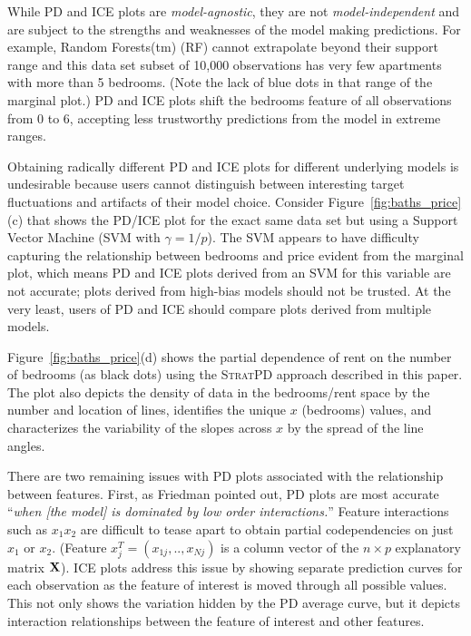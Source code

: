 \documentclass[12pt]{article}
\newcommand{\figref}[1]{Figure~\ref{#1}}
\newcommand{\cut}[1]{}
\newcommand{\spd}{\fontfamily{cmr}\textsc{\small StratPD}}
\begin{document}
\cut{The partial dependence plot broadly follows the marginal plot except for the prices of two and three bedrooms apartments, where it levels off. This is counterintuitive and exposes an issue with PD and ICE plots.} While PD and ICE plots are {\em model-agnostic}, they are not {\em model-independent} and are subject to the strengths and weaknesses of the model making predictions.  For example, Random Forests(tm) (RF) cannot extrapolate beyond their support range and this data set subset of 10,000 observations has very few apartments with more than 5 bedrooms.  (Note the lack of blue dots in that range of the marginal plot.) PD and ICE plots shift the bedrooms feature of all observations from 0 to 6, accepting less trustworthy predictions from the model in extreme ranges.   

Obtaining radically different PD and ICE plots for different underlying models is undesirable because users cannot distinguish between interesting target fluctuations and artifacts of their model choice. Consider \figref{fig:baths_price}(c) that shows the PD/ICE plot for the exact same data set but using a Support Vector Machine (SVM with $\gamma=1/p$). The SVM appears to have difficulty capturing the relationship between bedrooms and price evident from the marginal plot, which means PD and ICE plots derived from an SVM for this variable are not accurate; plots derived from high-bias models should not be trusted. At the very least, users of PD and ICE should compare plots derived from multiple models. 

\figref{fig:baths_price}(d) shows the partial dependence of rent on the number of bedrooms (as black dots) using the \spd{} approach described in this paper. The plot also depicts the density of data in the bedrooms/rent space by the number and location of lines, identifies the unique $x$ (bedrooms) values, and characterizes the variability of the slopes across $x$ by the spread of the line angles.

There are two remaining issues with PD plots associated with the relationship between features. First, as Friedman pointed out, PD plots are most accurate ``{\em when {\em [the model]} is dominated by low order interactions.}''  Feature interactions such as $x_1x_2$ are difficult to tease apart to obtain partial codependencies on just $x_1$ or $x_2$. (Feature $x_j^T = (x_{1j}, .., x_{Nj})$ is a column vector of the  $n \times p$ explanatory matrix ${\bf X}$). ICE plots address this issue by showing separate prediction curves for each observation as the feature of interest is moved through all possible values.  This not only shows the variation hidden by the PD average curve, but it depicts interaction relationships between the feature of interest and other features.
\end{document}
